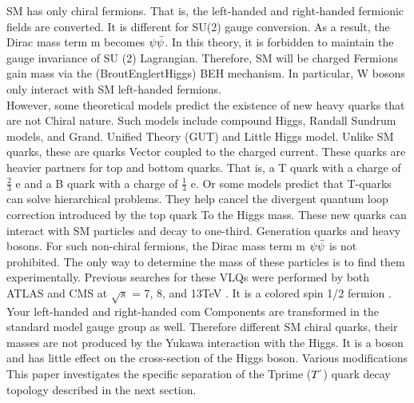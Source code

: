 SM has only chiral fermions. That is, the left-handed and right-handed fermionic fields are converted. 
 It is different for SU(2) gauge conversion. As a result, the Dirac mass term m becomes $\psi\Bar{\psi} $. 
 In this theory, it is  forbidden  to maintain the gauge invariance of SU (2) Lagrangian\cite{Aguilar_Arevalo_2018}. Therefore, SM will be charged  Fermions gain mass via the (BroutEnglertHiggs) BEH mechanism\cite{PhysRevLett.13.321}\cite{Higgs:1964pj}. In particular,  W bosons only interact with SM left-handed fermions. \\
 However, some theoretical models predict the existence of new heavy quarks that are not Chiral nature. Such models include compound Higgs, Randall Sundrum models\cite{Randall_1999}, and Grand. 
 Unified Theory (GUT)\cite{Kang_2008} and Little Higgs model\cite{Arkani_Hamed_2002}. Unlike SM quarks, these are quarks 
 Vector coupled to the charged current. These quarks are heavier partners for top and bottom quarks. That is, a T quark with a charge of $ \frac{2}{3} $ e and a B quark with a charge of $ \frac{1}{3} $ e. Or some models predict that T-quarks can solve hierarchical problems. 
 They help cancel the divergent quantum loop correction introduced by the top quark 
 To the Higgs mass. These new quarks can interact with  SM particles and  decay to one-third. 
 Generation quarks and  heavy bosons. For such non-chiral fermions, the Dirac mass term m $ \psi\Bar{\psi} $ is not prohibited. The only way to determine the mass of these particles is to find them experimentally.  Previous searches for these VLQs were performed by both ATLAS and CMS at $ \sqrt {s} $ = 7, 8, and 13TeV \cite{Aad_2014}. It is a colored spin 1/2 fermion \cite{VLQ_1}. 
 Your left-handed and right-handed com 
 Components are transformed in the standard model gauge group as well. Therefore different 
 SM chiral quarks, their masses are not produced by the Yukawa interaction with the Higgs. 
 It is a  boson and has little effect on the cross-section of the Higgs boson. Various modifications 
 This paper investigates the specific separation of the Tprime ($ T^`$) quark decay topology  described in the next section.
 
 
 







